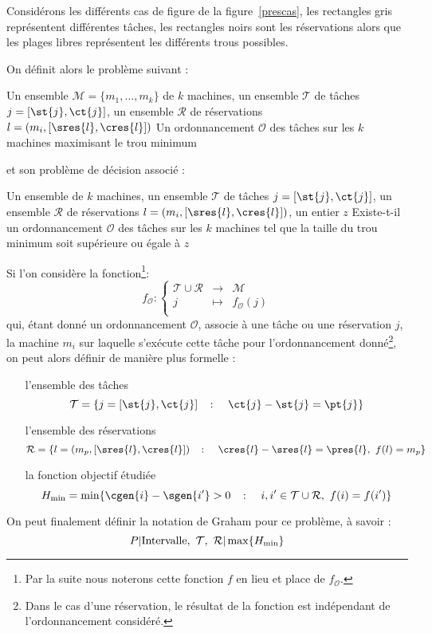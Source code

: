 \documentclass[a4paper,11pt]{thesis}
\begin{document}
\begin{nrmq}
    Considérons les différents cas de figure de la figure~\ref{prescas}, les rectangles gris
    représentent différentes tâches, les rectangles noirs sont les réservations alors que les plages
    libres représentent les différents trous possibles.
\end{nrmq}

On définit alors le problème suivant :

\dfopt{\fisched}
{Un ensemble $\mathcal{M} = \{m_1, \dots, m_k\}$ de $k$ machines, un ensemble $\mathcal{T}$ de
tâches $j = [\st{j}, \ct{j}]$, un ensemble $\mathcal{R}$ de réservations $l = (m_i, [\sres{l},
\cres{l}])$} 
{Un ordonnancement $\mathcal{O}$ des tâches sur les $k$ machines maximisant le trou
minimum}

et son problème de décision associé :

\dfpb{\fischedpi}
{Un ensemble de $k$ machines, un ensemble $\mathcal{T}$ de tâches $j = [\st{j}, \ct{j}]$, un
ensemble $\mathcal{R}$ de réservations $l = (m_i, [\sres{l}, \cres{l}])$, un entier $z$}
{Existe-t-il un ordonnancement $\mathcal{O}$ des tâches sur les $k$ machines tel que la taille du
trou minimum soit supérieure ou égale à $z$}

\begin{nrmq}
    Si l'on considère la fonction\footnote{Par la suite nous noterons cette fonction $f$ en lieu et
    place de $f_{\mathcal{O}}$.}: \[
        f_{\mathcal{O}} : \left \lbrace \begin{array}{rcl}
            \mathcal{T} \cup \mathcal{R} & \longrightarrow & \mathcal{M} \\
            j & \mapsto & f_{\mathcal{O}}(j) \\
        \end{array}
        \right .
    \]
    qui, étant donné un ordonnancement $\mathcal{O}$, associe à une tâche ou une réservation $j$, la
    machine $m_i$ sur laquelle s'exécute cette tâche pour l'ordonnancement donné\footnote{Dans le
    cas d'une réservation, le résultat de la fonction est indépendant de l'ordonnancement
    considéré.}, on peut alors définir de manière plus formelle : \begin{itemize}
        \item[l'ensemble des tâches] \[
                \mathcal{T} = \{j = [\st{j}, \ct{j}] \quad \colon \quad \ct{j} - \st{j} = \pt{j} \}
            \]
        \item[l'ensemble des réservations] \[
                \mathcal{R} = \{l = (m_p, [\sres{l}, \cres{l}]) \quad \colon \quad \cres{l} -
                \sres{l} = \pres{l},\ f(l) = m_p\}
            \]
        \item[la fonction objectif étudiée] \[
                H_{\min} = \min \{ \cgen{i} - \sgen{i'} > 0 \quad \colon \quad i,i' \in
                \mathcal{T} \cup \mathcal{R},\ f(i) = f(i')\}
            \]
    \end{itemize}

    On peut finalement définir la notation de Graham pour ce problème, à savoir : \[
        P \arrowvert \mbox{Intervalle},\ \mathcal{T},\ \mathcal{R} \arrowvert \max\{H_{\min}\}
    \]
\end{nrmq}
\end{document}
